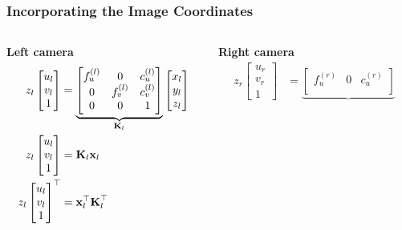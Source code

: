 \begin{frame}
    \frametitle{Incorporating the Image Coordinates}
    \begin{columns}[T]
        \begin{column}{0.5\textwidth}
            \centering
            \textbf{Left camera}
            \begin{align*}
                z_l \begin{bmatrix} u_l \\ v_l \\ 1 \end{bmatrix} &=
                \underbrace{\begin{bmatrix}
                    f_u^{(l)} & 0 & c_u^{(l)} \\
                    0 & f_v^{(l)} & c_v^{(l)} \\
                    0 & 0 & 1
                \end{bmatrix}}_{\boldsymbol{\mathbf{K}}_{l}}\begin{bmatrix} x_l \\ y_l \\ z_l \end{bmatrix}\\
                z_{l} \begin{bmatrix} u_l \\ v_l \\ 1 \end{bmatrix} &= \boldsymbol{\mathbf{K}}_{l} \boldsymbol{\mathbf{x}}_{l}\\
                z_{l} \begin{bmatrix} u_l \\ v_l \\ 1 \end{bmatrix}^{\top} &= \boldsymbol{\mathbf{x}}_{l}^{\top} \boldsymbol{\mathbf{K}}_{l}^{\top}
            \end{align*}
        \end{column}
        \begin{column}{0.5\textwidth}
            \centering
            \textbf{Right camera}
            \begin{align*}
                z_r \begin{bmatrix} u_r \\ v_r \\ 1 \end{bmatrix} &=
                \underbrace{\begin{bmatrix}
                    f_u^{(r)} & 0 & c_u^{(r)} \\

\end{bmatrix}}
\end{align*}
\end{column}
\end{columns}
\end{frame}
